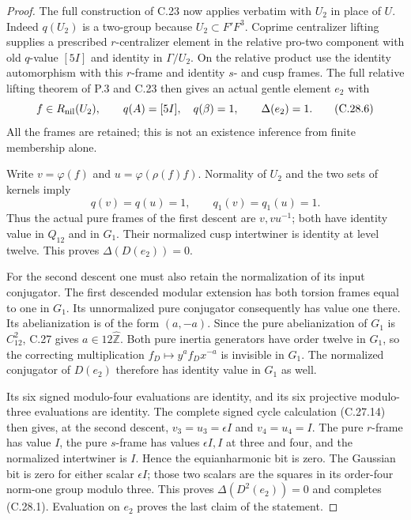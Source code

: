 \begin{proof}
The full construction of C.23 now applies verbatim
with $U_2$ in place of $U$. Indeed $q(U_2)$ is a
two-group because $U_2\subset F'F^3$.
Coprime centralizer lifting supplies a prescribed
$r$-centralizer element in the relative pro-two
component with old $q$-value $[5I]$ and identity
in $\Gamma/U_2$. On the relative product use the
identity automorphism with this $r$-frame and
identity $s$- and cusp frames. The full relative
lifting theorem of P.3 and C.23 then gives an
actual gentle element $e_2$ with
\[
 f\in R_{\rm nil}(U_2),\qquad
 q(A)=[5I],\quad q(\beta)=1,
 \qquad \Delta(e_2)=1.
 \tag{C.28.6}
\]
All the frames are retained; this is not an
existence inference from finite membership alone.

Write $v=\varphi(f)$ and
$u=\varphi(\rho(f)f)$. Normality of $U_2$ and
the two sets of kernels imply
\[
       q(v)=q(u)=1,
       \qquad q_1(v)=q_1(u)=1.
 \tag{C.28.7}
\]
Thus the actual pure frames of the first descent
are $v,vu^{-1}$; both have identity value in
$Q_{12}$ and in $G_1$. Their normalized cusp
intertwiner is identity at level twelve.
This proves $\Delta(D(e_2))=0$.

For the second descent one must also retain the
normalization of its input conjugator. The first
descended modular extension has both torsion
frames equal to one in $G_1$. Its unnormalized
pure conjugator consequently has value one there.
Its abelianization is of the form $(a,-a)$.
Since the pure abelianization of $G_1$ is
$C_{12}^2$, C.27 gives $a\in12\widehat{\mathbb Z}$.
Both pure inertia generators have order twelve
in $G_1$, so the correcting multiplication
$f_D\mapsto y^a f_Dx^{-a}$ is invisible in
$G_1$. The normalized conjugator of $D(e_2)$
therefore has identity value in $G_1$ as well.

Its six signed modulo-four evaluations are
identity, and its six projective modulo-three
evaluations are identity. The complete signed
cycle calculation (C.27.14) then gives, at the
second descent, $v_3=u_3=\epsilon I$ and
$v_4=u_4=I$. The pure $r$-frame has value $I$,
the pure $s$-frame has values $\epsilon I,I$
at three and four, and the normalized intertwiner
is $I$. Hence the equianharmonic bit is zero.
The Gaussian bit is zero for either scalar
$\epsilon I$; those two scalars are the squares
in its order-four norm-one group modulo three.
This proves $\Delta(D^2(e_2))=0$ and completes
(C.28.1). Evaluation on $e_2$ proves the last
claim of the statement.
\end{proof}


